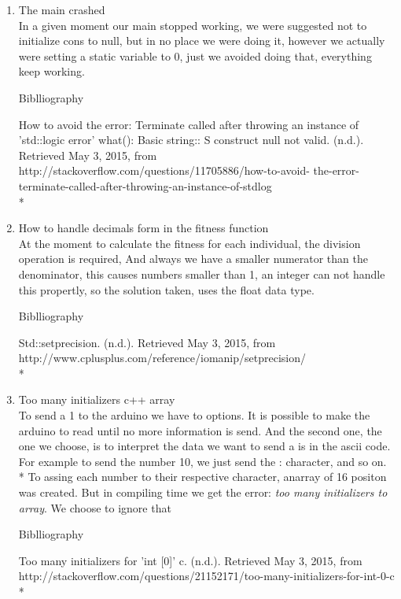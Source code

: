 \documentclass[twocolumn]{IEEEtran}
\begin{document}
\begin{enumerate}
    
	\item The main crashed\\
    In a given moment our main stopped working, we were suggested not to initialize cons 
    to null, but in no place we were doing it, however we actually were setting a static 
    variable to 0, just we avoided doing that, everything keep working.
    \begin{center}
    Biblliography
    \end{center}
    How to avoid the error: Terminate called after throwing an instance of 
    'std::logic error' what(): Basic string:: S construct null not valid. (n.d.). 
    Retrieved May 3, 2015, from http://stackoverflow.com/questions/11705886/how-to-avoid-
    the-error-terminate-called-after-throwing-an-instance-of-stdlog\\*


	\item How to handle decimals form in the fitness function\\
    	At the moment to calculate the fitness for each individual, the division 
        operation is required, And always we have a smaller numerator than the 
        denominator, this causes numbers smaller than 1, an integer can not handle this 
        propertly, so the solution taken, uses the float data type.
    \begin{center}
    Biblliography
    \end{center}
    Std::setprecision. (n.d.). Retrieved May 3, 2015, from 
    http://www.cplusplus.com/reference/iomanip/setprecision/\\*
	
    \item Too many initializers c++ array \\
    	To send a 1 to the arduino we have to options. It is possible to make the arduino 
        to read until no more information is send. And the second one, the one we choose, 
        is to interpret the data we want to send a is in the ascii code. For example to 
        send the number 10, we just send the : character, and so on.\\*
        To assing each number to their respective character, anarray of 16 positon was
        created. But in compiling time we get the error: \textit{too many initializers 
        to array}. We choose to ignore that 
        
    \begin{center}
    Biblliography
    \end{center}
    Too many initializers for 'int [0]' c. (n.d.). Retrieved May 3, 2015, from 
    http://stackoverflow.com/questions/21152171/too-many-initializers-for-int-0-c\\*


\end{enumerate}
\end{document}
